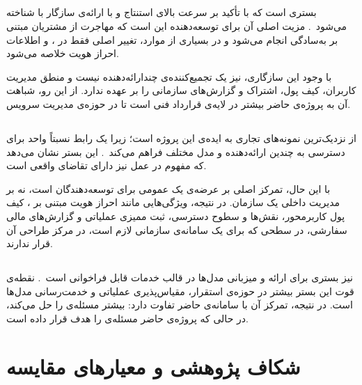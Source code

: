 \subsection{}

 بستری است که با تأکید بر سرعت بالای استنتاج و با ارائه‌ی
 سازگار با  شناخته می‌شود~\cite{groq2024}. مزیت اصلی آن
برای توسعه‌دهنده این است که مهاجرت از مشتریان مبتنی بر 
به‌سادگی انجام می‌شود و در بسیاری از موارد، تغییر اصلی فقط در
،  و اطلاعات احراز هویت خلاصه می‌شود.

با وجود این سازگاری،  نیز یک تجمیع‌کننده‌ی چندارائه‌دهنده نیست و
منطق مدیریت کاربران، کیف پول، اشتراک و گزارش‌های سازمانی را بر عهده
ندارد. از این رو، شباهت آن به پروژه‌ی حاضر بیشتر در لایه‌ی قرارداد
فنی  است تا در حوزه‌ی مدیریت سرویس.

\subsection{}

 از نزدیک‌ترین نمونه‌های تجاری به ایده‌ی این پروژه است؛
زیرا یک رابط نسبتاً واحد برای دسترسی به چندین ارائه‌دهنده و مدل مختلف
فراهم می‌کند~\cite{openrouter2024}. این بستر نشان می‌دهد که مفهوم
 در عمل نیز دارای تقاضای واقعی است.

با این حال، تمرکز اصلی  بر عرضه‌ی یک  عمومی برای
توسعه‌دهندگان است، نه بر مدیریت داخلی یک سازمان. در نتیجه، ویژگی‌هایی
مانند احراز هویت مبتنی بر ، کیف پول کاربرمحور، نقش‌ها و سطوح دسترسی،
ثبت ممیزی عملیاتی و گزارش‌های مالی سفارشی، در سطحی که برای یک سامانه‌ی
سازمانی لازم است، در مرکز طراحی آن قرار ندارند.

\subsection{}

 نیز بستری برای ارائه و میزبانی مدل‌ها در قالب
خدمات قابل فراخوانی است~\cite{anyscale2024}. نقطه‌ی قوت این بستر بیشتر در
حوزه‌ی استقرار، مقیاس‌پذیری عملیاتی و خدمت‌رسانی مدل‌ها است. در نتیجه،
تمرکز آن با سامانه‌ی حاضر تفاوت دارد:  بیشتر مسئله‌ی
 را حل می‌کند، در حالی که پروژه‌ی
حاضر مسئله‌ی  را هدف قرار داده است.

\section{شکاف پژوهشی و معیارهای مقایسه}

